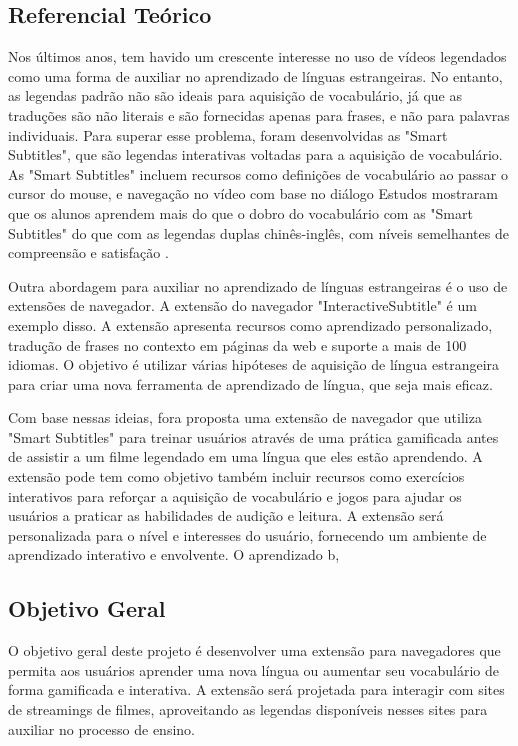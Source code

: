 \documentclass[12pt]{article}
\begin{document}
\subsection{Referencial Teórico}
Nos últimos anos, tem havido um crescente interesse no uso de vídeos legendados como uma forma de auxiliar no aprendizado de línguas estrangeiras. No entanto, as legendas padrão não são ideais para aquisição de vocabulário, já que as traduções são não literais e são fornecidas apenas para frases, e não para palavras individuais. Para superar esse problema, foram desenvolvidas as "Smart Subtitles", que são legendas interativas voltadas para a aquisição de vocabulário. As "Smart Subtitles" incluem recursos como definições de vocabulário ao passar o cursor do mouse, e navegação no vídeo com base no diálogo \cite{Kovacs13} Estudos mostraram que os alunos aprendem mais do que o dobro do vocabulário com as "Smart Subtitles" do que com as legendas duplas chinês-inglês, com níveis semelhantes de compreensão e satisfação \cite{Kovacs14}.

Outra abordagem para auxiliar no aprendizado de línguas estrangeiras é o uso de extensões de navegador. A extensão do navegador "InteractiveSubtitle" \cite{ElBatanony21} é um exemplo disso. A extensão apresenta recursos como aprendizado personalizado, tradução de frases no contexto em páginas da web e suporte a mais de 100 idiomas. O objetivo é utilizar várias hipóteses de aquisição de língua estrangeira para criar uma nova ferramenta de aprendizado de língua, que seja mais eficaz.

Com base nessas ideias, fora proposta uma extensão de navegador que utiliza "Smart Subtitles" para treinar usuários através de uma prática gamificada antes de assistir a um filme legendado em uma língua que eles estão aprendendo. A extensão pode tem como objetivo também incluir recursos como exercícios interativos para reforçar a aquisição de vocabulário e jogos para ajudar os usuários a praticar as habilidades de audição e leitura. A extensão será personalizada para o nível e interesses do usuário, fornecendo um ambiente de aprendizado interativo e envolvente.
O aprendizado b\cite{10.1145/2939672.2939850}, \cite{10.1145/3534678.3539081}

\subsection{Objetivo Geral}

O objetivo geral deste projeto é desenvolver uma extensão para navegadores que permita aos usuários aprender uma nova língua ou aumentar seu vocabulário de forma gamificada e interativa. A extensão será projetada para interagir com sites de streamings de filmes, aproveitando as legendas disponíveis nesses sites para auxiliar no processo de ensino. 
\end{document}
